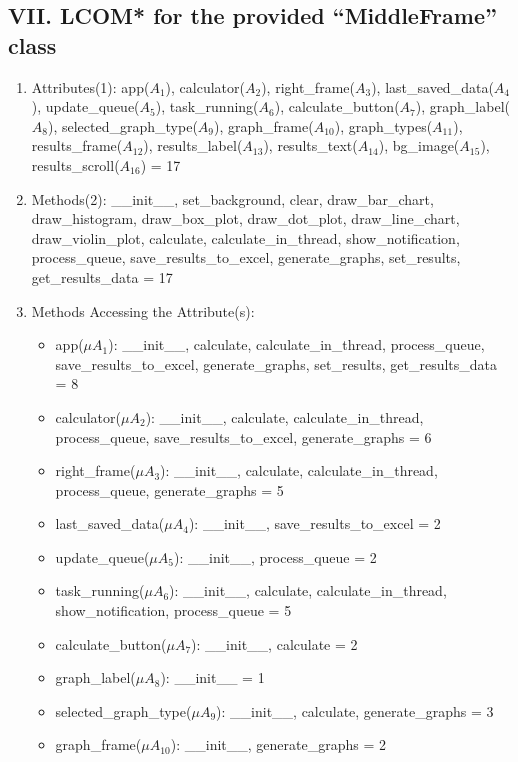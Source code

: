 \documentclass[english,12pt,a4paper]{report}
\begin{document}
	\subsection*{VII. LCOM* for the provided ``MiddleFrame'' class}
	\begin{enumerate}[label=\arabic*.]
		\item Attributes(1): app(\(A_1\)), calculator(\(A_2\)), right\_frame(\(A_3\)), last\_saved\_data(\(A_4\)), update\_queue(\(A_5\)), task\_running(\(A_6\)), calculate\_button(\(A_7\)), graph\_label(\(A_8\)), selected\_graph\_type(\(A_9\)), graph\_frame(\(A_{10}\)), graph\_types(\(A_{11}\)), results\_frame(\(A_{12}\)), results\_label(\(A_{13}\)), results\_text(\(A_{14}\)), bg\_image(\(A_{15}\)), results\_scroll(\(A_{16}\)) = 17
		\item Methods(2): \_\_init\_\_, set\_background, clear, draw\_bar\_chart, draw\_histogram, draw\_box\_plot, draw\_dot\_plot, draw\_line\_chart, draw\_violin\_plot, calculate, calculate\_in\_thread, show\_notification, process\_queue, save\_results\_to\_excel, generate\_graphs, set\_results, get\_results\_data = 17
		\item Methods Accessing the Attribute(s):
		\begin{itemize}[label={$\bullet$}]
			\item app(\(\mu A_1\)): \_\_init\_\_, calculate, calculate\_in\_thread, process\_queue, save\_results\_to\_excel, generate\_graphs, set\_results, get\_results\_data = 8
			\item calculator(\(\mu A_2\)): \_\_init\_\_, calculate, calculate\_in\_thread, process\_queue, save\_results\_to\_excel, generate\_graphs = 6
			\item right\_frame(\(\mu A_3\)): \_\_init\_\_, calculate, calculate\_in\_thread, process\_queue, generate\_graphs = 5
			\item last\_saved\_data(\(\mu A_4\)): \_\_init\_\_, save\_results\_to\_excel = 2
			\item update\_queue(\(\mu A_5\)): \_\_init\_\_, process\_queue = 2
			\item task\_running(\(\mu A_6\)): \_\_init\_\_, calculate, calculate\_in\_thread, show\_notification, process\_queue = 5
			\item calculate\_button(\(\mu A_7\)): \_\_init\_\_, calculate = 2
			\item graph\_label(\(\mu A_8\)): \_\_init\_\_ = 1
			\item selected\_graph\_type(\(\mu A_9\)): \_\_init\_\_, calculate, generate\_graphs = 3
			\item graph\_frame(\(\mu A_{10}\)): \_\_init\_\_, generate\_graphs = 2

\end{itemize}
\end{enumerate}
\end{document}
